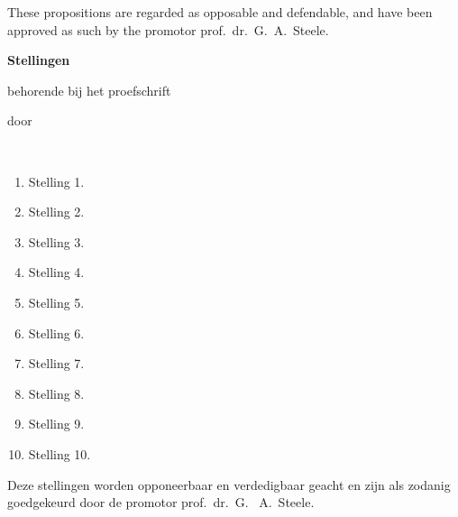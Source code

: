 \documentclass{dissertation}
\begin{document}
\bigskip
\bigskip

\begin{center}
These propositions are regarded as opposable and defendable, and have been approved as such by the promotor prof.\ dr.\ G.\ A.\ Steele.
\end{center}

\clearpage
{

\begin{center}

{\Large\titlefont\bfseries Stellingen}

\bigskip

behorende bij het proefschrift

\bigskip

{\makeatletter
\titlestyle\bfseries\large\@title
\makeatother}

{\makeatletter
\ifx\@subtitle\undefined\else
    \titlefont\titleshape\@subtitle
\fi
\makeatother}

\bigskip

door

\bigskip

\makeatletter
{\large\titlefont\bfseries\@firstname\ {\titleshape\@lastname}}
\makeatother

\end{center}

\bigskip
\bigskip

\begin{enumerate}

\item Stelling 1.
\item Stelling 2.
\item Stelling 3.
\item Stelling 4.
\item Stelling 5.
\item Stelling 6.
\item Stelling 7.
\item Stelling 8.
\item Stelling 9.
\item Stelling 10.

\end{enumerate}

\bigskip
\bigskip

\begin{center}
Deze stellingen worden opponeerbaar en verdedigbaar geacht en zijn als zodanig goedgekeurd door de promotor prof.\ dr.\ G. \ A.\ Steele.
\end{center}

}
\end{document}
